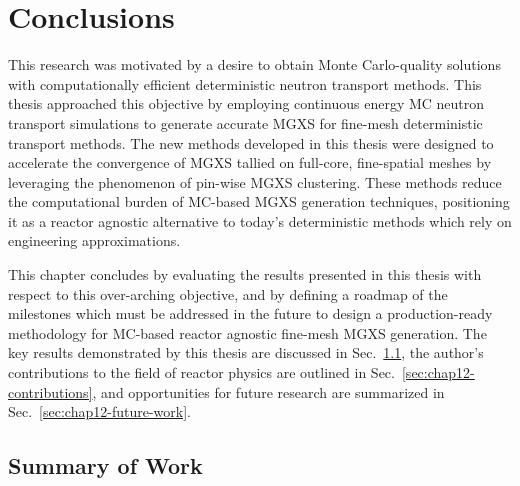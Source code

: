\chapter{Conclusions}
\label{chap:conclusions-future-work}

This research was motivated by a desire to obtain Monte Carlo-quality solutions with computationally efficient deterministic neutron transport methods. This thesis approached this objective by employing continuous energy \ac{MC} neutron transport simulations to generate accurate \ac{MGXS} for fine-mesh deterministic transport methods. The new methods developed in this thesis were designed to accelerate the convergence of \ac{MGXS} tallied on full-core, fine-spatial meshes by leveraging the phenomenon of pin-wise \ac{MGXS} clustering. These methods reduce the computational burden of \ac{MC}-based \ac{MGXS} generation techniques, positioning it as a reactor agnostic alternative to today's deterministic methods which rely on engineering approximations.

This chapter concludes by evaluating the results presented in this thesis with respect to this over-arching objective, and by defining a roadmap of the milestones which must be addressed in the future to design a production-ready methodology for \ac{MC}-based reactor agnostic fine-mesh \ac{MGXS} generation. The key results demonstrated by this thesis are discussed in Sec.~\ref{sec:chap12-conclusions}, the author's contributions to the field of reactor physics are outlined in Sec.~\ref{sec:chap12-contributions}, and opportunities for future research are summarized in Sec.~\ref{sec:chap12-future-work}.



\section{Summary of Work}
\label{sec:chap12-conclusions}


